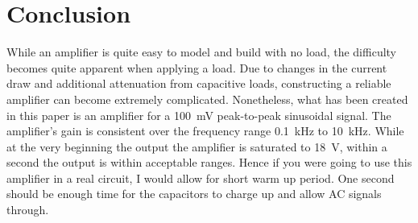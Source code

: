 \documentclass[journal]{IEEEtran}
\begin{document}
%





\section{Conclusion}

While an amplifier is quite easy to model and build with no load, the difficulty becomes quite apparent when applying a load. Due to changes in the current draw and additional attenuation from capacitive loads, constructing a reliable amplifier can become extremely complicated. Nonetheless, what has been created in this paper is an amplifier for a \SI{100}{\milli\volt} peak-to-peak sinusoidal signal. The amplifier's gain is consistent over the frequency range \SI{0.1}{\kilo\hertz} to \SI{10}{\kilo\hertz}. While at the very beginning the output the amplifier is saturated to \SI{18}{\volt}, within a second the output is within acceptable ranges. Hence if you were going to use this amplifier in a real circuit, I would allow for short warm up period. One second should be enough time for the capacitors to charge up and allow AC signals through.
\end{document}
